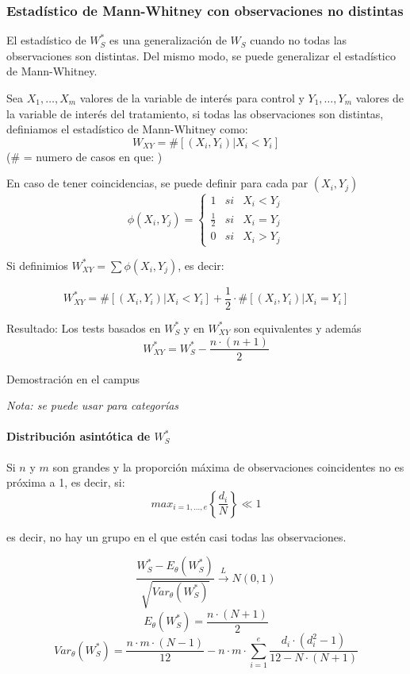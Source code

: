 \subsubsection{Estadístico de Mann-Whitney con observaciones no distintas}

El estadístico de $W_S^*$ es una generalización de $W_S$ cuando no todas las observaciones son distintas.
Del mismo modo, se puede generalizar el estadístico de Mann-Whitney. 

Sea $X_1,\dots,X_m$ valores de la variable de interés para control y $Y_1,\dots,Y_m$ valores de la variable de interés del tratamiento, si todas las observaciones son distintas, definiamos el estadístico de Mann-Whitney como:
\[
    W_{XY}= \# [(X_i,Y_i)|X_i<Y_i]
\]
($\#$ = numero de casos en que: )

En caso de tener coincidencias, se puede definir para cada par $(X_i,Y_j)$
\[
    \phi(X_i,Y_j)=\left\{ 
        \begin{matrix}
            1 & si & X_i<Y_j \\
            \frac{1}{2} & si & X_i=Y_j \\
            0 & si & X_i>Y_j
        \end{matrix}
    \right.
\]

Si definimios $W_{XY}^*=\sum \phi (X_i,Y_j)$, es decir:

\[
    W_{XY}^* = \# [(X_i,Y_i)|X_i<Y_i] + \frac{1}{2} \cdot \# [(X_i,Y_i)|X_i=Y_i]
\]

Resultado: Los tests basados en $W_S^*$ y en $W_{XY}^*$ son equivalentes y además
\[
    W_{XY}^*=W_S^*-\frac{n \cdot (n+1)}{2}
\]

Demostración en el campus

\textit{Nota: se puede usar para categorías}

\paragraph{Distribución asintótica de $W_S^*$}

Si $n$ y $m$ son grandes y la proporción máxima de observaciones coincidentes no es próxima a 1, es decir, si:
\[
    max_{i=1,\dots,e}\left\{\frac{d_i}{N} \right\} \ll 1
\]

es decir, no hay un grupo en el que estén casi todas las observaciones.

\[
    \frac{W_S^*-E_\theta(W_S^*)}{\sqrt{Var_\theta(W_S^*)}} \xrightarrow{L} N(0,1)
\]
\[
    E_\theta(W_S^*)=\frac{n \cdot (N+1)}{2}
\]
\[
    Var_\theta(W_S^*)= \frac{n \cdot m \cdot (N-1)}{12}-n\cdot m \cdot \sum_{i=1}^{e} \frac{d_i \cdot (d_i^2-1)}{12-N \cdot (N+1)}
\]


